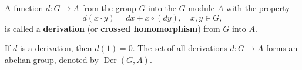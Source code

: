 A function $d : G \rightarrow A$ from the group $G$ into the $G$-module $A$ with the property
$$d(x \cdot y) = dx + x \circ (dy), \quad x, y \in G,$$
is called a \textbf{derivation} (or \textbf{crossed homomorphism}) from $G$ into $A$.

If $d$ is a derivation, then $d(1) = 0$. The set of all derivations $d : G \rightarrow A$ forms an abelian group, denoted by $\operatorname{Der}(G, A)$.
